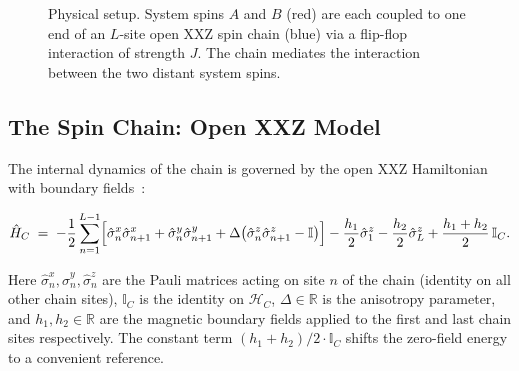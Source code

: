 \documentclass[12pt,a4paper]{article}
\newcommand{\Ham}{\hat{H}}
\newcommand{\Hilb}{\mathcal{H}}
\newcommand{\sigx}{\hat{\sigma}^x}
\newcommand{\sigy}{\hat{\sigma}^y}
\newcommand{\sigz}{\hat{\sigma}^z}
\begin{document}
\begin{figure}[htbp]
\centering
{}
\caption{Physical setup.  System spins $A$ and $B$ (red) are each coupled to
one end of an $L$-site open XXZ spin chain (blue) via a flip-flop interaction of
strength $J$.  The chain mediates the interaction between the two distant system
spins.}
\label{fig:setup}
\end{figure}

\subsection{The Spin Chain: Open XXZ Model}
\label{subsec:xxz}

The internal dynamics of the chain is governed by the open XXZ Hamiltonian with
boundary fields~\cite{Bayat2005}:

\begin{equation}
  \Ham_C \;=\; -\frac{1}{2}\sum_{n=1}^{L-1}
    \Bigl[\sigx_n\sigx_{n+1} + \sigy_n\sigy_{n+1}
          + \Delta\bigl(\sigz_n\sigz_{n+1} - \mathbb{I}\bigr)\Bigr]
    - \frac{h_1}{2}\sigz_1 - \frac{h_2}{2}\sigz_L
    + \frac{h_1+h_2}{2}\,\mathbb{I}_C.
  \label{eq:Hchain}
\end{equation}

Here $\sigx_n, \sigy_n, \sigz_n$ are the Pauli matrices acting on site $n$ of the
chain (identity on all other chain sites), $\mathbb{I}_C$ is the identity on $\Hilb_C$,
$\Delta\in\mathbb{R}$ is the anisotropy parameter, and $h_1, h_2\in\mathbb{R}$
are the magnetic boundary fields applied to the first and last chain sites
respectively.  The constant term $(h_1{+}h_2)/2\cdot\mathbb{I}_C$ shifts the
zero-field energy to a convenient reference.
\end{document}
